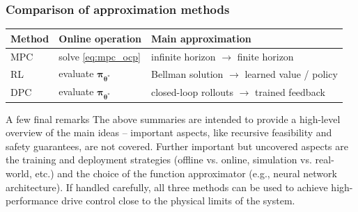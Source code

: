 \begin{frame}
	\frametitle{Comparison of approximation methods}
	\begin{center}
		\begin{tabular}{P{0.15\textwidth}P{0.2\textwidth}P{0.55\textwidth}}
			\toprule
			\textbf{Method} & \textbf{Online operation}           & \textbf{Main approximation}                           \\
			\midrule
			MPC             & solve \eqref{eq:mpc_ocp}            & infinite horizon $\rightarrow$ finite horizon         \\
			RL              & evaluate $\bm{\pi}_{\bm{\theta}^*}$ & Bellman solution $\rightarrow$ learned value / policy \\
			DPC             & evaluate $\bm{\pi}_{\bm{\theta}^*}$ & closed-loop rollouts $\rightarrow$ trained feedback   \\
			\bottomrule
		\end{tabular}
	\end{center}\pause%
	\begin{varblock}{A few final remarks}
		The above summaries are intended to provide a high-level overview of the main ideas -- important aspects, like recursive feasibility and safety guarantees, are not covered. Further important but uncovered aspects are the training and deployment strategies (offline vs. online, simulation vs. real-world, etc.) and the choice of the function approximator (e.g., neural network architecture). If handled carefully, all three methods can be used to achieve high-performance drive control close to the physical limits of the system.
	\end{varblock}
\end{frame}


